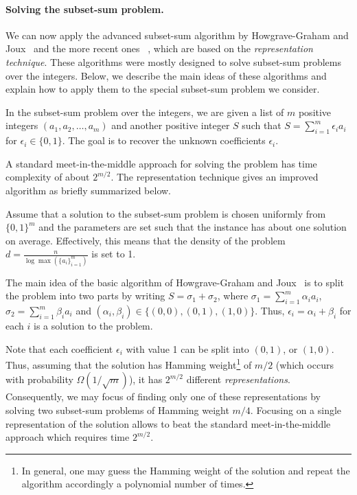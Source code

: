 \paragraph{Solving the subset-sum problem.}
We can now apply the advanced subset-sum algorithm by
Howgrave{-}Graham and Joux~\cite{Howgrave-GrahamJ10} and the more recent ones
~\cite{BeckerCJ11,BonnetainBSS20},
which are based on the \emph{representation technique}.
These algorithms were mostly designed to solve subset-sum problems over the integers.
Below, we describe the main ideas of these algorithms
and explain how to apply them to the special subset-sum problem
we consider.

In the subset-sum problem over the integers,
we are given a list of $m$ positive  integers $(a_1,a_2,\ldots,a_m)$
and another positive integer $S$ such that $S = \sum_{i=1}^{m} \epsilon_i a_i$
for $\epsilon_i \in \{0,1\}$. The goal is to recover the unknown coefficients $\epsilon_i$.

A standard meet-in-the-middle approach for solving the problem has time complexity of about $2^{m/2}$.
The representation technique gives an improved algorithm as briefly summarized below.

Assume that a solution to the subset-sum problem is chosen uniformly from $\{0,1\}^m$
and the parameters are set such that the instance has about one solution on average. Effectively, this means that the density of the problem $d = \tfrac{n}{\log \max(\{a_i\}_{i=1}^{m})}$ is set to 1.

The main idea of the basic algorithm of Howgrave{-}Graham and Joux~\cite{Howgrave-GrahamJ10}
is to split the problem into two parts by writing
$S = \sigma_1 + \sigma_2$,
where $\sigma_1 = \sum_{i=1}^{m} \alpha_i a_i$, $\sigma_2 = \sum_{i=1}^{m} \beta_i a_i$
and $(\alpha_i,\beta_i) \in \{(0,0),(0,1),(1,0)\}$.
Thus, $\epsilon_i = \alpha_i + \beta_i$ for each $i$ is a solution to the problem.

Note that each coefficient $\epsilon_i$ with value 1 can be split into $(0,1)$, or $(1,0)$.
Thus, assuming that the solution has Hamming weight\footnote{In general, one
may guess the Hamming weight of the solution and
repeat the algorithm accordingly a polynomial number of times.} of $m/2$
(which occurs with probability $\Omega(1/\sqrt{m})$),
it has $2^{m/2}$ different \emph{representations}.
Consequently, we may focus of finding only one of these representations
by solving two subset-sum problems of Hamming weight $m/4$.
Focusing on a single representation of the solution
allows to beat the standard meet-in-the-middle approach which requires time $2^{m/2}$.


